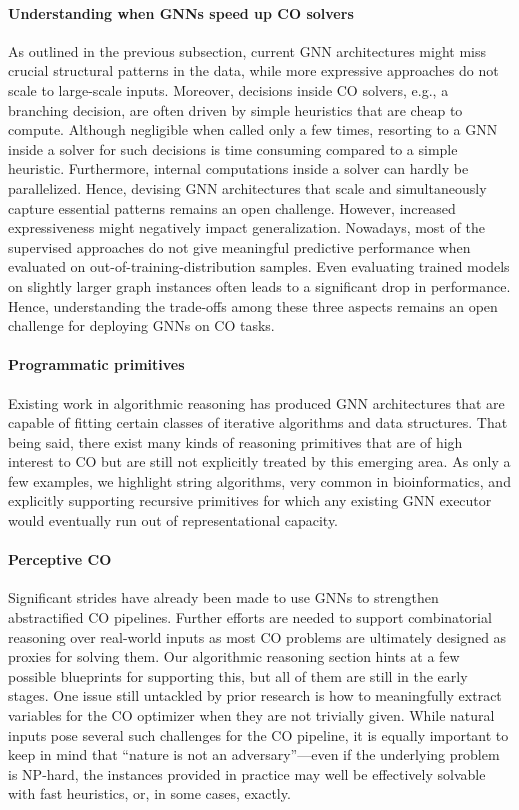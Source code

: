 \documentclass[twoside,11pt]{article}
\begin{document}
\paragraph{Understanding when GNNs speed up CO solvers} As outlined in the previous subsection, current GNN architectures might miss crucial structural patterns in the data, while more expressive approaches do not scale to large-scale inputs. Moreover, decisions inside CO solvers, e.g., a branching decision, are often driven by simple heuristics that are cheap to compute. Although negligible when called only a few times, resorting to a GNN inside a solver for such decisions is time consuming compared to a simple heuristic. Furthermore, internal computations inside a solver can hardly be parallelized. Hence, devising GNN architectures that scale {and} simultaneously capture essential patterns remains an open challenge. However, increased expressiveness might negatively impact generalization. Nowadays, most of the supervised approaches do not give meaningful predictive performance when evaluated on out-of-training-distribution samples. Even evaluating trained models on slightly larger graph instances often leads to a significant drop in performance. Hence, understanding the trade-offs among these three aspects remains an open challenge for deploying GNNs on CO tasks.



\paragraph{Programmatic primitives} Existing work in algorithmic reasoning has produced GNN architectures that are capable of fitting certain classes of iterative algorithms and data structures. That being said, there exist many kinds of reasoning primitives that are of high interest to CO but are still not explicitly treated by this emerging area. As only a few examples, we highlight string algorithms, very common in bioinformatics, and explicitly supporting recursive primitives for which any existing GNN executor would eventually run out of representational capacity.

\paragraph{Perceptive CO} Significant strides have already been made to use GNNs to strengthen abstractified CO pipelines. Further efforts are needed to support combinatorial reasoning over real-world inputs as most CO problems are ultimately designed as proxies for solving them. Our algorithmic reasoning section hints at a few possible blueprints for supporting this, but all of them are still in the early stages. One issue still untackled by prior research is how to meaningfully extract variables for the CO optimizer when they are not trivially given. While natural inputs pose several such challenges for the CO pipeline, it is equally important to keep in mind that ``nature is not an adversary''---even if the underlying problem is \textsf{NP}-hard, the instances provided in practice may well be effectively solvable with fast heuristics, or, in some cases, exactly. 
\end{document}
